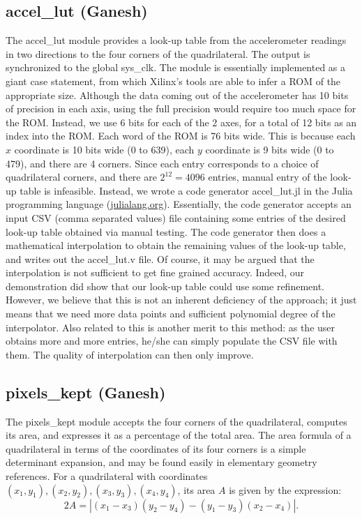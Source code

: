 \documentclass{article}
\begin{document}
\subsection{accel\_lut (Ganesh)}
The accel\_lut module provides a look-up table from the accelerometer readings in two directions to the four corners of the quadrilateral.
The output is synchronized to the global sys\_clk.
The module is essentially implemented as a giant case statement, from which Xilinx's tools are able to infer a ROM of the appropriate size.
Although the data coming out of the accelerometer has 10 bits of precision in each axis,
using the full precision would require too much space for the ROM.
Instead, we use 6 bits for each of the 2 axes, for a total of 12 bits as an index into the ROM.
Each word of the ROM is 76 bits wide.
This is because each $x$ coordinate is 10 bits wide (0 to 639), each $y$ coordinate is 9 bits wide (0 to 479), and there are 4 corners.
Since each entry corresponds to a choice of quadrilateral corners, and there are $2^{12} = 4096$ entries, manual entry of the look-up table is infeasible.
Instead, we wrote a code generator accel\_lut.jl in the Julia programming language (\url{julialang.org}).
Essentially, the code generator accepts an input CSV (comma separated values) file containing some entries of the desired look-up table obtained via manual testing.
The code generator then does a mathematical interpolation to obtain the remaining values of the look-up table, and writes out the accel\_lut.v file.
Of course, it may be argued that the interpolation is not sufficient to get fine grained accuracy.
Indeed, our demonstration did show that our look-up table could use some refinement.
However, we believe that this is not an inherent deficiency of the approach; it just means that we need more data points and sufficient polynomial degree of the interpolator.
Also related to this is another merit to this method: as the user obtains more and more entries,
he/she can simply populate the CSV file with them.
The quality of interpolation can then only improve.

\subsection{pixels\_kept (Ganesh)}
The pixels\_kept module accepts the four corners of the quadrilateral, computes its area, and expresses it as a percentage of the total area.
The area formula of a quadrilateral in terms of the coordinates of its four corners is a simple determinant expansion,
and may be found easily in elementary geometry references.
For a quadrilateral with coordinates $(x_1, y_1), (x_2, y_2), (x_3, y_3), (x_4, y_4)$, its area $A$ is given by the expression:
\begin{equation}
    2A = | (x_1 - x_3)(y_2 - y_4) - (y_1 - y_3)(x_2 - x_4) |.
\end{equation}
\end{document}
